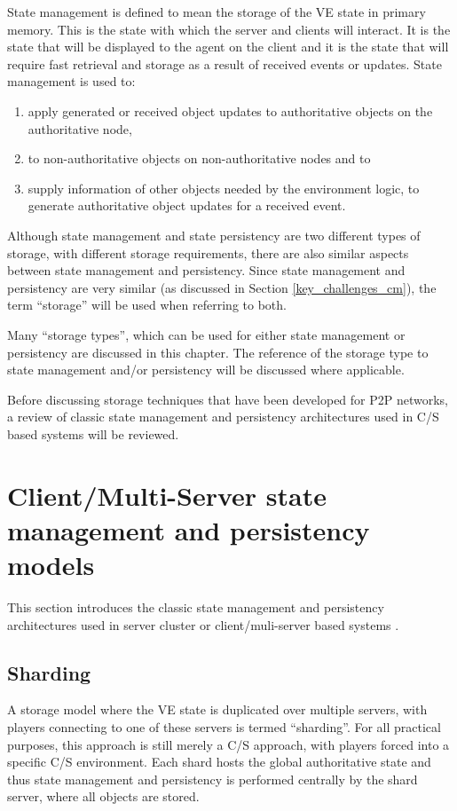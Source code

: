 State management is defined to mean the storage of the VE state in primary memory. This is the state with which the server and clients will interact. It is the state that will be displayed to the agent on the client and it is the state that will require fast retrieval and storage as a result of received events or updates. State management is used to:
\begin{enumerate}
\item apply generated or received object updates to authoritative objects on the authoritative node,
\item to non-authoritative objects on non-authoritative nodes and to
\item supply information of other objects needed by the environment logic, to generate authoritative object updates for a received event.
\end{enumerate}

Although state management and state persistency are two different types of storage, with different storage requirements, there are also similar aspects between state management and persistency. Since state management and persistency are very similar (as discussed in Section \ref{key_challenges_cm}), the term ``storage'' will be used when referring to both.

Many ``storage types'', which can be used for either state management or persistency are discussed in this chapter. The reference of the storage type to state management and/or persistency will be discussed where applicable.

Before discussing storage techniques that have been developed for P2P networks, a review of classic state management and persistency architectures used in C/S based systems will be reviewed.

\section{Client/Multi-Server state management and persistency models}
\label{cms_models}

This section introduces the classic state management and persistency architectures used in server cluster or client/muli-server based systems \cite{Hu_voronoi_IM}.

\subsection{Sharding}
\label{sharding}

A storage model where the VE state is duplicated over multiple servers, with players connecting to one of these servers is termed ``sharding''. For all practical purposes, this approach is still merely a C/S approach, with players forced into a specific C/S environment. Each shard hosts the global authoritative state and thus state management and persistency is performed centrally by the shard server, where all objects are stored.


